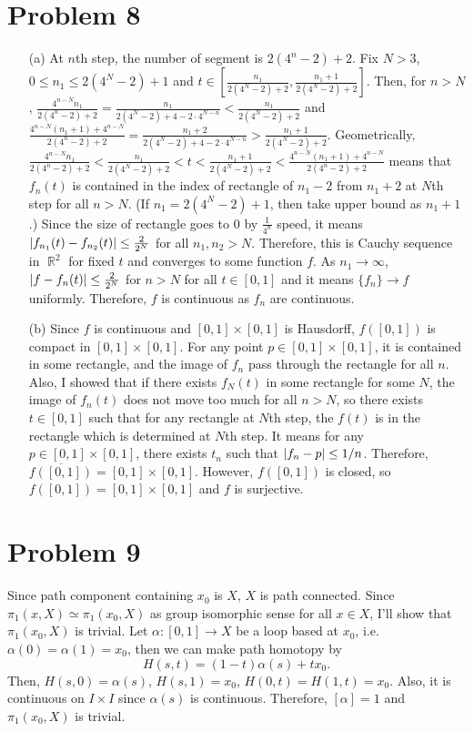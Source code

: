 \documentclass{article}
\DeclareMathOperator{\rr}{\mathbb{R}}
\begin{document}
\section*{Problem 8}
\begin{enumerate}
\item[(a)]
At $n$th step, the number of segment is $2(4^n-2)+2$. Fix $N>3$, $0\leq n_1\leq 2(4^N-2)+1$ and $t\in \left[\frac{n_1}{2(4^N-2)+2}, \frac{n_1+1}{2(4^N-2)+2}\right]$. Then, for $n> N$, $\frac{4^{n-N} n_1}{2(4^n-2)+2}=\frac{n_1}{2(4^N-2)+4-2\cdot 4^{N-n}}<\frac{n_1}{2(4^N-2)+2}$ and $\frac{4^{n-N} (n_1+1)+4^{n-N}}{2(4^n-2)+2}=\frac{n_1+2}{2(4^N-2)+4-2\cdot 4^{N-n}}>\frac{n_1+1}{2(4^N-2)+2}$. Geometrically, $\frac{4^{n-N} n_1}{2(4^n-2)+2}<\frac{n_1}{2(4^N-2)+2}<t<\frac{n_1+1}{2(4^N-2)+2}<\frac{4^{n-N} (n_1+1)+4^{n-N}}{2(4^n-2)+2}$ means that $f_n(t)$ is contained in the index of rectangle of $n_1-2$ from $n_1+2$ at $N$th step for all $n>N$. (If $n_1=2(4^N-2)+1$, then take upper bound as $n_1+1$.) Since the size of rectangle goes to $0$ by $\frac{1}{4^n}$ speed, it means $\abs{f_{n_1}(t)-f_{n_2}(t)}\leq \frac{2}{2^N}$ for all $n_1,n_2>N$. Therefore, this is Cauchy sequence in $\rr^2$ for fixed $t$ and converges to some function $f$. As $n_1\rightarrow \infty$, $\abs{f-f_n(t)}\leq \frac{2}{2^N}$ for $n>N$ for all $t\in [0,1]$ and it means $\{f_n\}\rightarrow f$ uniformly. Therefore, $f$ is continuous as $f_n$ are continuous.
\item[(b)] Since $f$ is continuous and $[0,1]\times [0,1]$ is Hausdorff, $f([0,1])$ is compact in $[0,1]\times [0,1]$. For any point $p\in[0,1]\times [0,1]$, it is contained in some rectangle, and the image of $f_n$ pass through the rectangle for all $n$. Also, I showed that if there exists $f_N(t)$ in some rectangle for some $N$, the image of $f_n(t)$ does not move too much for all $n>N$, so there exists $t\in [0,1]$ such that for any rectangle at $N$th step, the $f(t)$ is in the rectangle which is determined at $N$th step. It means for any $p\in [0,1]\times [0,1]$, there exists $t_n$ such that $\abs{f_n-p}\leq 1/n$. Therefore, $\overline{f([0,1])}=[0,1]\times [0,1]$. However, $f([0,1])$ is closed, so $f([0,1])=[0,1]\times [0,1]$ and $f$ is surjective.
\end{enumerate}
\section*{Problem 9}
Since path component containing $x_0$ is $X$, $X$ is path connected. Since $\pi_1(x, X)\simeq \pi_1(x_0, X)$ as group isomorphic sense for all $x\in X$, I'll show that $\pi_1(x_0, X)$ is trivial. Let $\alpha:[0,1]\rightarrow X$ be a loop based at $x_0$, i.e. $\alpha(0)=\alpha(1)=x_0$, then we can make path homotopy by
\begin{equation*}
H(s, t)=(1-t)\alpha(s)+tx_0.
\end{equation*}
Then, $H(s, 0)=\alpha(s)$, $H(s, 1)=x_0$, $H(0, t)=H(1, t)=x_0$. Also, it is continuous on $I\times I$ since $\alpha(s)$ is continuous. Therefore, $[\alpha]=1$ and $\pi_1(x_0, X)$ is trivial.
\end{document}
